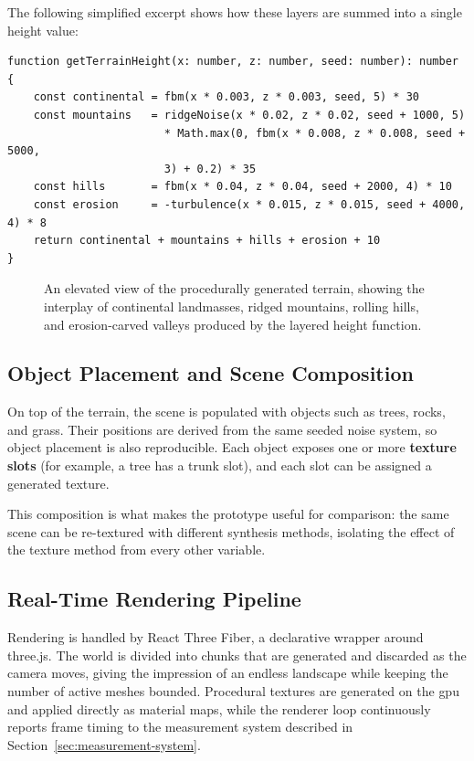 The following simplified excerpt shows how these layers are summed into a single height value:

\begin{lstlisting}[style=defaultcode, caption={Multi-octave terrain height function combining continental, mountain, hill, and erosion layers.}, label={lst:terrain-generation-code-example}]
function getTerrainHeight(x: number, z: number, seed: number): number {
    const continental = fbm(x * 0.003, z * 0.003, seed, 5) * 30
    const mountains   = ridgeNoise(x * 0.02, z * 0.02, seed + 1000, 5)
                        * Math.max(0, fbm(x * 0.008, z * 0.008, seed + 5000, 
                        3) + 0.2) * 35
    const hills       = fbm(x * 0.04, z * 0.04, seed + 2000, 4) * 10
    const erosion     = -turbulence(x * 0.015, z * 0.015, seed + 4000, 4) * 8
    return continental + mountains + hills + erosion + 10
}
\end{lstlisting}

\begin{figure}[H]
    \centering
    {An elevated view of the procedurally generated terrain, showing the interplay of continental landmasses, ridged mountains, rolling hills, and erosion-carved valleys produced by the layered height function.}
    \label{fig:terrain-display}
\end{figure}

\subsection{Object Placement and Scene Composition}

On top of the terrain, the scene is populated with objects such as trees, rocks, and grass. Their positions are derived from the same seeded noise system, so object placement is also reproducible. Each object exposes one or more \textbf{texture slots} (for example, a tree has a trunk slot), and each slot can be assigned a generated texture.

This composition is what makes the prototype useful for comparison: the same scene can be re-textured with different synthesis methods, isolating the effect of the texture method from every other variable.

\subsection{Real-Time Rendering Pipeline}

Rendering is handled by React Three Fiber, a declarative wrapper around three.js. The world is divided into chunks that are generated and discarded as the camera moves, giving the impression of an endless landscape while keeping the number of active meshes bounded. Procedural textures are generated on the \gls{gpu} and applied directly as material maps, while the renderer loop continuously reports frame timing to the measurement system described in Section~\ref{sec:measurement-system}.

